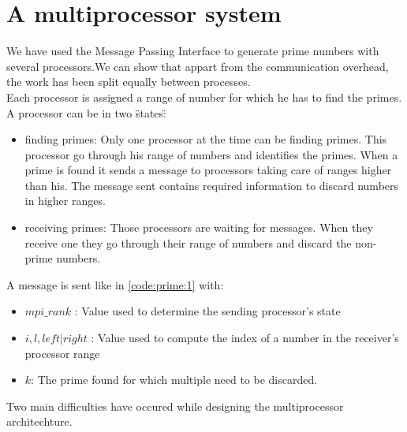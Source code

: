 \newpage\cleardoublepage{}
\section{A multiprocessor system}


We have used the Message Passing Interface to generate prime numbers with several processors.We can show that appart from the communication overhead, the work has been split equally between processes. \\ Each processor is assigned a range of number for which he has to find the primes. A processor can be in two \"states\":
\begin{itemize}
	\item{finding primes: }
	Only one processor at the time can be finding primes. This processor go through his range of numbers and identifies the primes. When a prime is found it sends a message to processors taking care of ranges higher than his. The message sent contains required information to discard numbers in higher ranges. 
	\item{receiving primes: }
	Those processors are waiting for messages. When they receive one they go through their range of numbers and discard the non-prime numbers. 

\end{itemize}


A message is sent like in \ref{code:prime:1} with:

\begin{itemize}
	\item{$mpi\_rank$ :}
	Value used to determine the sending processor's state
	
	\item{$i,l, left|right$ :}
	Value used to compute the index of a number in the receiver's processor range
	\item{$k$:} 
	The prime found for which multiple need to be discarded.

\end{itemize}


Two main difficulties have occured while designing the multiprocessor architechture.
